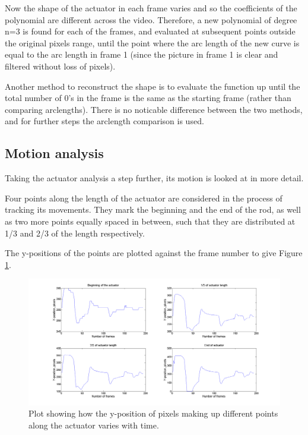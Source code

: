 Now the shape of the actuator in each frame varies and so the coefficients of the polynomial are different across the video. Therefore, a new polynomial of degree n=3 is found for each of the frames, and evaluated at subsequent points outside the original pixels range, until the point where the arc length of the new curve is equal to the arc length in frame 1 (since the picture in frame 1 is clear and filtered without loss of pixels).

Another method to reconstruct the shape is to evaluate the function up until the total number of 0's in the frame is the same as the starting frame (rather than comparing arclengths). There is no noticable difference between the two methods, and for further steps the arclength comparison is used.

\subsection{Motion analysis}

Taking the actuator analysis a step further, its motion is looked at in more detail. 

Four points along the length of the actuator are considered in the process of tracking its movements. They mark the beginning and the end of the rod, as well as two more points equally spaced in between, such that they are distributed at 1/3 and 2/3 of the length respectively. 

The y-positions of the points are plotted against the frame number to give Figure \ref{fig:pointsAlong}.

\begin{figure}[H]
	\centering
	\includegraphics[width=1\textwidth]{Pictures/pointsAlongActuator.png}
     \caption{Plot showing how the y-position of pixels making up different points along the actuator varies with time.}
     \label{fig:pointsAlong}
\end{figure}

